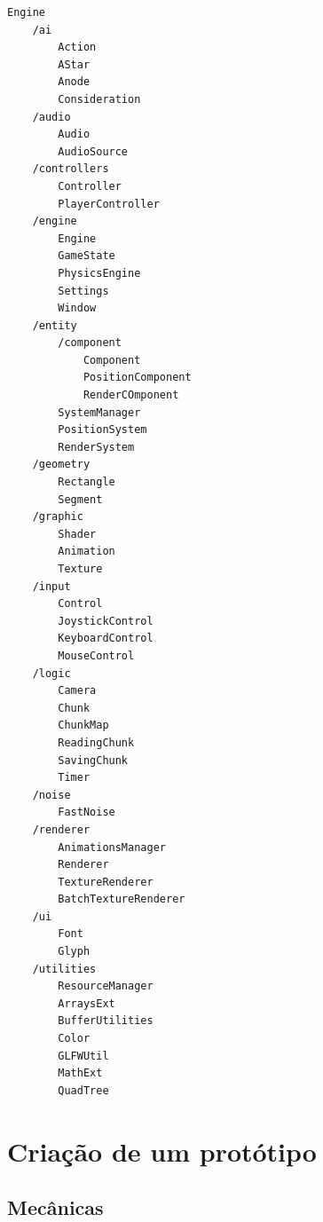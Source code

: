 \documentclass[12pt, 
openright, 
oneside, 
a4paper,    
brazil]{facom-ufu-abntex2}
\begin{document}
\begin{lstlisting}[caption=Árvore de arquivos do projeto]
Engine
    /ai
        Action
        AStar
        Anode
        Consideration
    /audio
        Audio
        AudioSource
    /controllers
        Controller
        PlayerController
    /engine
        Engine
        GameState
        PhysicsEngine
        Settings
        Window
    /entity
        /component
            Component
            PositionComponent
            RenderCOmponent
        SystemManager
        PositionSystem
        RenderSystem
    /geometry
        Rectangle
        Segment
    /graphic
        Shader
        Animation
        Texture
    /input
        Control
        JoystickControl
        KeyboardControl
        MouseControl
    /logic
        Camera
        Chunk
        ChunkMap
        ReadingChunk
        SavingChunk
        Timer
    /noise
        FastNoise
    /renderer
        AnimationsManager
        Renderer
        TextureRenderer
        BatchTextureRenderer
    /ui
        Font
        Glyph
    /utilities
        ResourceManager
        ArraysExt
        BufferUtilities
        Color
        GLFWUtil
        MathExt
        QuadTree
\end{lstlisting}        


\chapter{Criação de um protótipo}
\label{sec:desenv}
\section{Mecânicas}
\end{document}
